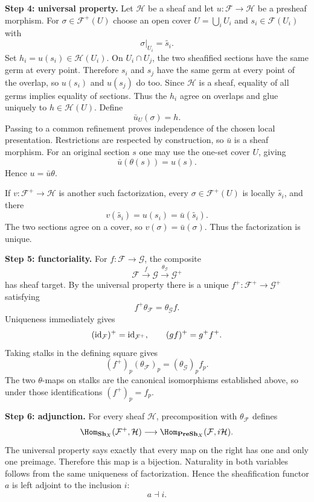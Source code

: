 \begin{solution}
\textbf{Step 4: universal property.}
Let $\mathcal H$ be a sheaf and let $u:\mathcal F\to\mathcal H$ be a presheaf morphism.
For $\sigma\in\mathcal F^+(U)$ choose an open cover $U=\bigcup_iU_i$ and
$s_i\in\mathcal F(U_i)$ with
\[
\sigma|_{U_i}=\widetilde{s_i}.
\]
Set $h_i=u(s_i)\in\mathcal H(U_i)$.  On $U_i\cap U_j$, the two sheafified sections have the
same germ at every point.  Therefore $s_i$ and $s_j$ have the same germ at every point of
the overlap, so $u(s_i)$ and $u(s_j)$ do too.  Since $\mathcal H$ is a sheaf, equality of all
germs implies equality of sections.  Thus the $h_i$ agree on overlaps and glue uniquely to
$h\in\mathcal H(U)$.  Define
\[
\bar u_U(\sigma)=h.
\]
Passing to a common refinement proves independence of the chosen local presentation.
Restrictions are respected by construction, so $\bar u$ is a sheaf morphism.  For an
original section $s$ one may use the one-set cover $U$, giving
\[
\bar u(\theta(s))=u(s).
\]
Hence $u=\bar u\theta$.

If $v:\mathcal F^+\to\mathcal H$ is another such factorization, every
$\sigma\in\mathcal F^+(U)$ is locally $\widetilde{s_i}$, and there
\[
v(\widetilde{s_i})=u(s_i)=\bar u(\widetilde{s_i}).
\]
The two sections agree on a cover, so $v(\sigma)=\bar u(\sigma)$.  Thus the factorization is
unique.

\textbf{Step 5: functoriality.}
For $f:\mathcal F\to\mathcal G$, the composite
\[
\mathcal F\xrightarrow{f}\mathcal G\xrightarrow{\theta_{\mathcal G}}\mathcal G^+
\]
has sheaf target.  By the universal property there is a unique
$f^+:\mathcal F^+\to\mathcal G^+$ satisfying
\[
f^+\theta_{\mathcal F}=\theta_{\mathcal G}f.
\]
Uniqueness immediately gives
\[
(\operatorname{id}_{\mathcal F})^+=\operatorname{id}_{\mathcal F^+},
\qquad
(gf)^+=g^+f^+.
\]
Taking stalks in the defining square gives
\[
(f^+)_p(\theta_{\mathcal F})_p
=(\theta_{\mathcal G})_pf_p.
\]
The two $\theta$-maps on stalks are the canonical isomorphisms established above, so under
those identifications $(f^+)_p=f_p$.

\textbf{Step 6: adjunction.}
For every sheaf $\mathcal H$, precomposition with $\theta_{\mathcal F}$ defines
\[
\Hom_{\Sh_X}(\mathcal F^+,\mathcal H)
\longrightarrow
\Hom_{\PreSh_X}(\mathcal F,i\mathcal H).
\]
The universal property says exactly that every map on the right has one and only one
preimage.  Therefore this map is a bijection.  Naturality in both variables follows from the
same uniqueness of factorization.  Hence the sheafification functor $a$ is left adjoint to
the inclusion $i$:
\[
a\dashv i.
\]
\end{solution}

